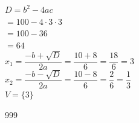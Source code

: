 \documentclass[a4paper]{article}
\begin{document}
$ D = b^2 - 4ac $\\

$ = 100 - 4 \cdot 3 \cdot 3 $\\

$ = 100 - 36 $\\

$ = 64 $\\

$ x_1 = \dfrac{-b + \sqrt{D}}{2a} = \dfrac{10 + 8}{6} = \dfrac{18}{6} = 3 $\\

$ x_2 = \dfrac{-b - \sqrt{D}}{2a} = \dfrac{10 - 8}{6} = \dfrac{2}{6} = \dfrac{1}{3} $\\

$ V = \{ 3 \} $\\

\begin{thebibliography}{999}
\end{thebibliography}
\end{document}
